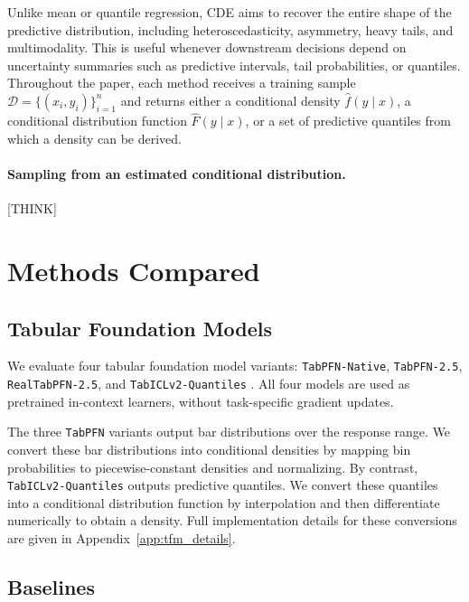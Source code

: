 \documentclass{article}
\newcommand{\method}[1]{\texttt{#1}}
\newcommand{\cD}{\mathcal{D}}
\begin{document}
Unlike mean or quantile regression, CDE aims to recover the entire shape of the
predictive distribution, including heteroscedasticity, asymmetry, heavy tails,
and multimodality. This is useful whenever downstream decisions depend on
uncertainty summaries such as predictive intervals, tail probabilities, or
quantiles. Throughout the paper, each method receives a training sample
$\cD=\{(x_i,y_i)\}_{i=1}^n$ and returns either a conditional density
$\hat f(y\mid x)$, a conditional distribution function $\hat F(y\mid x)$, or a
set of predictive quantiles from which a density can be derived.


\paragraph{Sampling from an estimated conditional distribution.}
[THINK]

\section{Methods Compared}
\label{sec:methods}

\subsection{Tabular Foundation Models}
\label{sec:methods_tfm}

We evaluate four tabular foundation model variants:
\method{TabPFN-Native}, \method{TabPFN-2.5}, \method{RealTabPFN-2.5}, and
\method{TabICLv2-Quantiles}
\citep{hollmann2025tabpfn,qu2025tabicl,qu2026tabiclv2}. All four models are
used as pretrained in-context learners, without task-specific gradient updates.

The three \method{TabPFN} variants output bar distributions over the response
range. We convert these bar distributions into conditional densities by mapping
bin probabilities to piecewise-constant densities and normalizing. By contrast,
\method{TabICLv2-Quantiles} outputs predictive quantiles. We convert these
quantiles into a conditional distribution function by interpolation and then
differentiate numerically to obtain a density. Full implementation details for
these conversions are given in Appendix~\ref{app:tfm_details}.

\subsection{Baselines}
\label{sec:methods_baselines}
\end{document}
